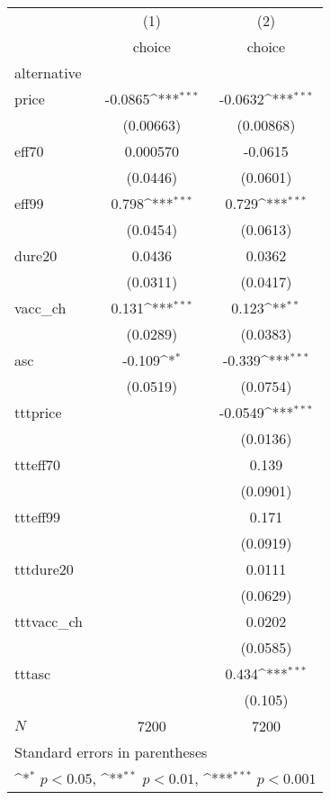 {
\def\sym#1{\ifmmode^{#1}\else\(^{#1}\)\fi}
\begin{tabular}{l*{2}{c}}
\hline\hline
            &\multicolumn{1}{c}{(1)}&\multicolumn{1}{c}{(2)}\\
            &\multicolumn{1}{c}{choice}&\multicolumn{1}{c}{choice}\\
\hline
alternative &                     &                     \\
price       &     -0.0865\sym{***}&     -0.0632\sym{***}\\
            &   (0.00663)         &   (0.00868)         \\
[1em]
eff70       &    0.000570         &     -0.0615         \\
            &    (0.0446)         &    (0.0601)         \\
[1em]
eff99       &       0.798\sym{***}&       0.729\sym{***}\\
            &    (0.0454)         &    (0.0613)         \\
[1em]
dure20      &      0.0436         &      0.0362         \\
            &    (0.0311)         &    (0.0417)         \\
[1em]
vacc\_ch     &       0.131\sym{***}&       0.123\sym{**} \\
            &    (0.0289)         &    (0.0383)         \\
[1em]
asc         &      -0.109\sym{*}  &      -0.339\sym{***}\\
            &    (0.0519)         &    (0.0754)         \\
[1em]
tttprice    &                     &     -0.0549\sym{***}\\
            &                     &    (0.0136)         \\
[1em]
ttteff70    &                     &       0.139         \\
            &                     &    (0.0901)         \\
[1em]
ttteff99    &                     &       0.171         \\
            &                     &    (0.0919)         \\
[1em]
tttdure20   &                     &      0.0111         \\
            &                     &    (0.0629)         \\
[1em]
tttvacc\_ch  &                     &      0.0202         \\
            &                     &    (0.0585)         \\
[1em]
tttasc      &                     &       0.434\sym{***}\\
            &                     &     (0.105)         \\
\hline
\(N\)       &        7200         &        7200         \\
\hline\hline
\multicolumn{3}{l}{\footnotesize Standard errors in parentheses}\\
\multicolumn{3}{l}{\footnotesize \sym{*} \(p<0.05\), \sym{**} \(p<0.01\), \sym{***} \(p<0.001\)}\\
\end{tabular}
}
